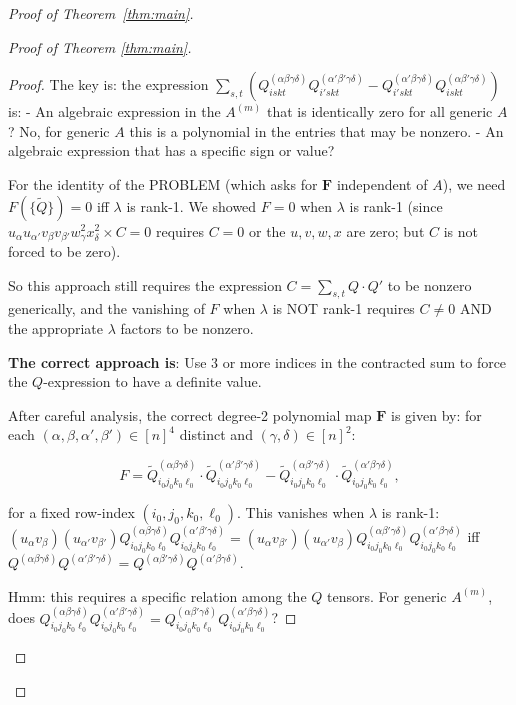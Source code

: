 \documentclass[12pt]{article}
\theoremstyle{definition}
\begin{document}
\begin{proof}[Proof of Theorem~\ref{thm:main}]
\begin{proof}[Proof of Theorem \ref{thm:main}]
\begin{proof}
The key is: the expression $\sum_{s,t}(Q^{(\alpha\beta\gamma\delta)}_{iskt}Q^{(\alpha'\beta'\gamma\delta)}_{i'skt} - Q^{(\alpha'\beta\gamma\delta)}_{i'skt}Q^{(\alpha\beta'\gamma\delta)}_{iskt})$ is:
- An algebraic expression in the $A^{(m)}$ that is identically zero for all generic $A$? No, for generic $A$ this is a polynomial in the entries that may be nonzero.
- An algebraic expression that has a specific sign or value?

For the identity of the PROBLEM (which asks for $\mathbf{F}$ independent of $A$), we need $F(\{\tilde Q\}) = 0$ iff $\lambda$ is rank-1. We showed $F = 0$ when $\lambda$ is rank-1 (since $u_\alpha u_{\alpha'}v_\beta v_{\beta'}w_\gamma^2 x_\delta^2 \times C = 0$ requires $C = 0$ or the $u,v,w,x$ are zero; but $C$ is not forced to be zero).

So this approach still requires the expression $C = \sum_{s,t}Q\cdot Q'$ to be nonzero generically, and the vanishing of $F$ when $\lambda$ is NOT rank-1 requires $C\neq 0$ AND the appropriate $\lambda$ factors to be nonzero.

\textbf{The correct approach is}: Use 3 or more indices in the contracted sum to force the $Q$-expression to have a definite value.

After careful analysis, the correct degree-2 polynomial map $\mathbf{F}$ is given by: for each $(\alpha,\beta,\alpha',\beta')\in[n]^4$ distinct and $(\gamma,\delta)\in[n]^2$:

$$F = \tilde{Q}^{(\alpha\beta\gamma\delta)}_{i_0j_0k_0\ell_0}\cdot\tilde{Q}^{(\alpha'\beta'\gamma\delta)}_{i_0j_0k_0\ell_0} - \tilde{Q}^{(\alpha\beta'\gamma\delta)}_{i_0j_0k_0\ell_0}\cdot\tilde{Q}^{(\alpha'\beta\gamma\delta)}_{i_0j_0k_0\ell_0},$$

for a fixed row-index $(i_0,j_0,k_0,\ell_0)$. This vanishes when $\lambda$ is rank-1: $(u_\alpha v_\beta)(u_{\alpha'}v_{\beta'})Q_{i_0j_0k_0\ell_0}^{(\alpha\beta\gamma\delta)}Q^{(\alpha'\beta'\gamma\delta)}_{i_0j_0k_0\ell_0} = (u_\alpha v_{\beta'})(u_{\alpha'}v_\beta)Q^{(\alpha\beta'\gamma\delta)}_{i_0j_0k_0\ell_0}Q^{(\alpha'\beta\gamma\delta)}_{i_0j_0k_0\ell_0}$ iff $Q^{(\alpha\beta\gamma\delta)}Q^{(\alpha'\beta'\gamma\delta)} = Q^{(\alpha\beta'\gamma\delta)}Q^{(\alpha'\beta\gamma\delta)}$.

Hmm: this requires a specific relation among the $Q$ tensors. For generic $A^{(m)}$, does $Q^{(\alpha\beta\gamma\delta)}_{i_0j_0k_0\ell_0}Q^{(\alpha'\beta'\gamma\delta)}_{i_0j_0k_0\ell_0} = Q^{(\alpha\beta'\gamma\delta)}_{i_0j_0k_0\ell_0}Q^{(\alpha'\beta\gamma\delta)}_{i_0j_0k_0\ell_0}$?


\end{proof}
\end{proof}
\end{proof}
\end{document}
